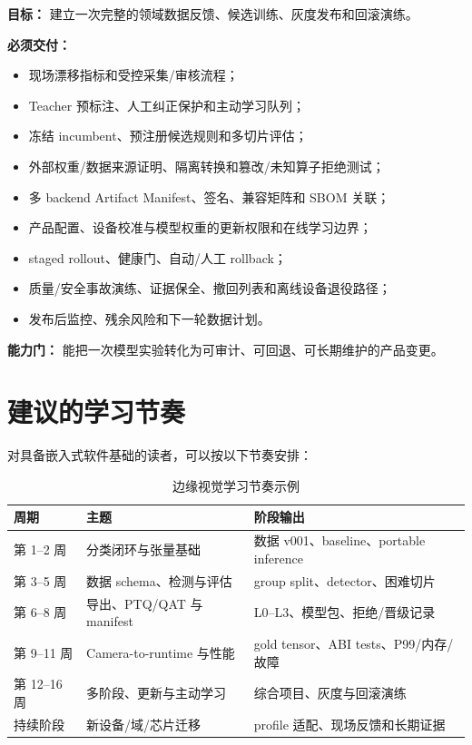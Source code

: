 \textbf{目标：} 建立一次完整的领域数据反馈、候选训练、灰度发布和回滚演练。

\textbf{必须交付：}

\begin{itemize}
  \item 现场漂移指标和受控采集/审核流程；
  \item Teacher 预标注、人工纠正保护和主动学习队列；
  \item 冻结 incumbent、预注册候选规则和多切片评估；
  \item 外部权重/数据来源证明、隔离转换和篡改/未知算子拒绝测试；
  \item 多 backend Artifact Manifest、签名、兼容矩阵和 SBOM 关联；
  \item 产品配置、设备校准与模型权重的更新权限和在线学习边界；
  \item staged rollout、健康门、自动/人工 rollback；
  \item 质量/安全事故演练、证据保全、撤回列表和离线设备退役路径；
  \item 发布后监控、残余风险和下一轮数据计划。
\end{itemize}

\textbf{能力门：} 能把一次模型实验转化为可审计、可回退、可长期维护的产品变更。

\section{建议的学习节奏}

对具备嵌入式软件基础的读者，可以按以下节奏安排：

\begin{table}[H]
  \centering
  \caption{边缘视觉学习节奏示例}
  \begin{tabular}{p{22mm}p{43mm}p{68mm}}
    \hline
    周期 & 主题 & 阶段输出 \\
    \hline
    第 1--2 周 & 分类闭环与张量基础 & 数据 v001、baseline、portable inference \\
    第 3--5 周 & 数据 schema、检测与评估 & group split、detector、困难切片 \\
    第 6--8 周 & 导出、PTQ/QAT 与 manifest & L0--L3、模型包、拒绝/晋级记录 \\
    第 9--11 周 & Camera-to-runtime 与性能 & gold tensor、ABI tests、P99/内存/故障 \\
    第 12--16 周 & 多阶段、更新与主动学习 & 综合项目、灰度与回滚演练 \\
    持续阶段 & 新设备/域/芯片迁移 & profile 适配、现场反馈和长期证据 \\
    \hline
  \end{tabular}
\end{table}

